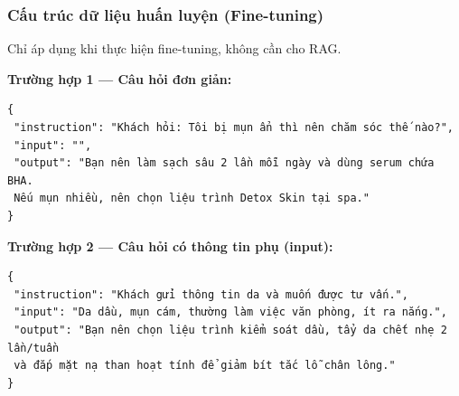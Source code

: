 \subsubsection{Cấu trúc dữ liệu huấn luyện (Fine-tuning)}
Chỉ áp dụng khi thực hiện fine-tuning, không cần cho RAG.

\noindent
\textbf{Trường hợp 1 — Câu hỏi đơn giản:}
\begin{verbatim}
{
 "instruction": "Khách hỏi: Tôi bị mụn ẩn thì nên chăm sóc thế nào?",
 "input": "",
 "output": "Bạn nên làm sạch sâu 2 lần mỗi ngày và dùng serum chứa BHA.
 Nếu mụn nhiều, nên chọn liệu trình Detox Skin tại spa."
}
\end{verbatim}

\noindent
\textbf{Trường hợp 2 — Câu hỏi có thông tin phụ (input):}
\begin{verbatim}
{
 "instruction": "Khách gửi thông tin da và muốn được tư vấn.",
 "input": "Da dầu, mụn cám, thường làm việc văn phòng, ít ra nắng.",
 "output": "Bạn nên chọn liệu trình kiểm soát dầu, tẩy da chết nhẹ 2 lần/tuần
 và đắp mặt nạ than hoạt tính để giảm bít tắc lỗ chân lông."
}
\end{verbatim}

\noindent


